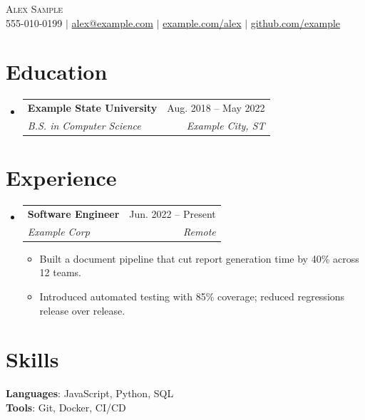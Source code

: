 \documentclass[letterpaper,11pt]{article}
\makeatletter
\newcommand{\resumeItem}[1]{\item\small{#1 \vspace{-2pt}}}
\newcommand{\resumeSubheading}[4]{
  \vspace{-2pt}\item
    \begin{tabular*}{0.97\textwidth}[t]{l@{\extracolsep{\fill}}r}
      \textbf{#1} & #2 \\
      \textit{\small#3} & \textit{\small #4} \\
    \end{tabular*}\vspace{-7pt}
}
\newcommand{\resumeSubHeadingListStart}{\begin{itemize}[leftmargin=0.15in, label={}]}
\newcommand{\resumeSubHeadingListEnd}{\end{itemize}}
\newcommand{\resumeItemListStart}{\begin{itemize}}
\newcommand{\resumeItemListEnd}{\end{itemize}\vspace{-5pt}}
\makeatother
\begin{document}
\begin{center}
    {\Huge \scshape Alex Sample} \\ \vspace{1pt}
    \small 555-010-0199 $|$ \href{mailto:alex@example.com}{alex@example.com} $|$
    \href{https://example.com/alex}{example.com/alex} $|$
    \href{https://github.com/example}{github.com/example}
\end{center}

\section{Education}
  \resumeSubHeadingListStart
    \resumeSubheading
      {Example State University}{Aug. 2018 -- May 2022}
      {B.S. in Computer Science}{Example City, ST}
  \resumeSubHeadingListEnd

\section{Experience}
  \resumeSubHeadingListStart
    \resumeSubheading
      {Software Engineer}{Jun. 2022 -- Present}
      {Example Corp}{Remote}
      \resumeItemListStart
        \resumeItem{Built a document pipeline that cut report generation time by 40\% across 12 teams.}
        \resumeItem{Introduced automated testing with 85\% coverage; reduced regressions release over release.}
      \resumeItemListEnd
  \resumeSubHeadingListEnd

\section{Skills}
 \begin{itemize}[leftmargin=0.15in, label={}]
    \small{\item{
     \textbf{Languages}{: JavaScript, Python, SQL} \\
     \textbf{Tools}{: Git, Docker, CI/CD}
    }}
 \end{itemize}
\end{document}
